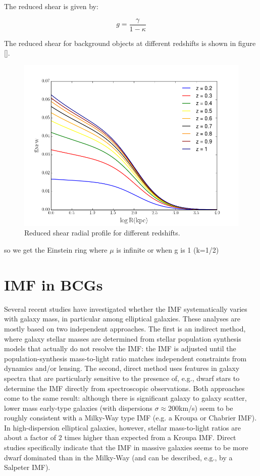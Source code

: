 The reduced shear is given by:

\begin{equation}
g=\frac{\gamma}{1-\kappa}
\end{equation}

The reduced shear for background objects at different redshifts is shown in figure []. 

\begin{figure}[H]
\centering
\includegraphics[width=12cm]{images/Reduced_Shear.png}
\caption[Reduced shear radial]{Reduced shear radial profile for different redshifts.}
\end{figure}

so we get the Einstein ring where $\mu$ is infinite or when g is 1 (k=1/2)

\section{IMF in BCGs}

Several recent studies have investigated whether the IMF systematically varies with galaxy mass, in particular among elliptical galaxies. These analyses are mostly based on two independent approaches. The first is an indirect method, where galaxy stellar masses are determined from stellar population synthesis models that actually do not resolve the IMF: the IMF is adjusted until the population-synthesis mass-to-light ratio matches independent constraints from dynamics and/or lensing. The second, direct method uses features in galaxy spectra that are particularly sensitive to the presence of, e.g., dwarf stars to determine the IMF directly from spectroscopic observations. Both approaches come to the same result: although there is significant galaxy to galaxy scatter, lower mass early-type galaxies (with dispersions $\sigma \approx 200$km/s) seem to be roughly consistent with a Milky-Way type IMF (e.g. a Kroupa or Chabrier IMF). In high-dispersion elliptical galaxies, however, stellar mass-to-light ratios are about a factor of 2 times higher than expected from a Kroupa IMF. Direct studies specifically indicate that the IMF in massive galaxies seems to be more dwarf dominated than in the Milky-Way (and can be described, e.g., by a Salpeter IMF).

